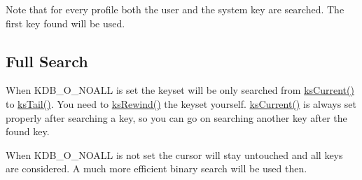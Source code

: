 Note that for every profile both the user and the system key are searched. The first key found will be used.\hypertarget{group__keyset_fullsearch}{}\subsection{Full Search}\label{group__keyset_fullsearch}
When KDB\_\-O\_\-NOALL is set the keyset will be only searched from \hyperlink{group__keyset_ga4287b9416912c5f2ab9c195cb74fb094}{ksCurrent()} to \hyperlink{group__keyset_gadca442c4ab43cf532b15091d7711559e}{ksTail()}. You need to \hyperlink{group__keyset_gabe793ff51f1728e3429c84a8a9086b70}{ksRewind()} the keyset yourself. \hyperlink{group__keyset_ga4287b9416912c5f2ab9c195cb74fb094}{ksCurrent()} is always set properly after searching a key, so you can go on searching another key after the found key.

When KDB\_\-O\_\-NOALL is not set the cursor will stay untouched and all keys are considered. A much more efficient binary search will be used then.


